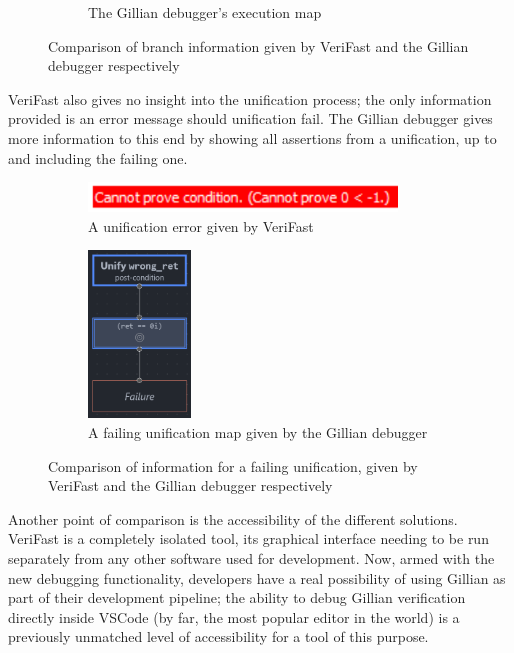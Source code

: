 \begin{figure}
\begin{subfigure}[b]{0.4\textwidth}
    \caption{The Gillian debugger's execution map}%
    \label{fig:execmap-final}
  \end{subfigure}
  \caption{Comparison of branch information given by VeriFast and the Gillian
  debugger respectively}%
  \label{fig:verifast-path-compare}
\end{figure}

VeriFast also gives no insight into the unification process; the only
information provided is an error message should unification fail. The Gillian
debugger gives more information to this end by showing all assertions from
a unification, up to and including the failing one.

\begin{figure}
  \centering
  \begin{subfigure}[b]{0.4\textwidth}
    \center{}
    \includegraphics[width=0.9\textwidth]{img/verifast-error.png}
    \caption{A unification error given by VeriFast}%
    \label{fig:verifast-error}
  \end{subfigure}
  \qquad
  \begin{subfigure}[b]{0.4\textwidth}
    \centering
    \includegraphics[width=0.3\textwidth]{img/unifymap-failure.png}
    \caption{A failing unification map given by the Gillian debugger}%
    \label{fig:unifymap-failure}
  \end{subfigure}
  \caption{Comparison of information for a failing unification, given by
  VeriFast and the Gillian debugger respectively}%
  \label{fig:verifast-unifyfail-compare}
\end{figure}

Another point of comparison is the accessibility of the different solutions.
VeriFast is a completely isolated tool, its graphical interface needing to be
run separately from any other software used for development. Now, armed with the
new debugging functionality, developers have a real possibility of using Gillian
as part of their development pipeline; the ability to debug Gillian verification
directly inside VSCode (by far, the most popular editor in the world) is a
previously unmatched level of accessibility for a tool of this purpose.

